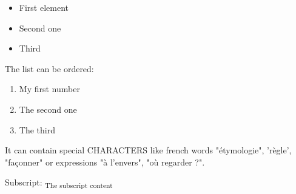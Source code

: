 \documentclass[letter,titlepage,oneside,11pt]{report}%
\begin{document}
\begin{itemize}%
\item First element%
\item Second one%
\item Third%
\end{itemize}%
\par%
\begin{FlushLeft}%
The list can be ordered:%
\end{FlushLeft}%
\begin{enumerate}%
\item My first number%
\item The second one%
\item The third%
\end{enumerate}%
\par%
\begin{FlushLeft}%
It can contain special CHARACTERS like french words "étymologie", 'règle', "façonner" or expressions "à l'envers", "où regarder ?".%
\end{FlushLeft}%
\par%
\begin{FlushLeft}%
Subscript: \textsubscript{The subscript content}%
\end{FlushLeft}%
\par%
\begin{FlushLeft}%
\end{FlushLeft}%
\par%
\begin{FlushLeft}%
\end{FlushLeft}%
\end{document}
